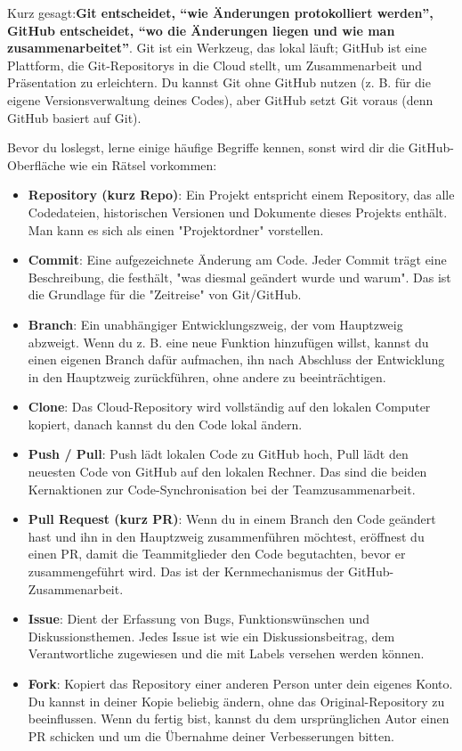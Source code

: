 Kurz gesagt:\textbf{Git entscheidet, “wie Änderungen protokolliert werden”, GitHub entscheidet, “wo die Änderungen liegen und wie man zusammenarbeitet”}. Git ist ein Werkzeug, das lokal läuft; GitHub ist eine Plattform, die Git-Repositorys in die Cloud stellt, um Zusammenarbeit und Präsentation zu erleichtern. Du kannst Git ohne GitHub nutzen (z. B. für die eigene Versionsverwaltung deines Codes), aber GitHub setzt Git voraus (denn GitHub basiert auf Git).



Bevor du loslegst, lerne einige häufige Begriffe kennen, sonst wird dir die GitHub-Oberfläche wie ein Rätsel vorkommen:

\begin{itemize}
  \item \textbf{Repository (kurz Repo)}: Ein Projekt entspricht einem Repository, das alle Codedateien, historischen Versionen und Dokumente dieses Projekts enthält. Man kann es sich als einen "Projektordner" vorstellen.
  \item \textbf{Commit}: Eine aufgezeichnete Änderung am Code. Jeder Commit trägt eine Beschreibung, die festhält, "was diesmal geändert wurde und warum". Das ist die Grundlage für die "Zeitreise" von Git/GitHub.
  \item \textbf{Branch}: Ein unabhängiger Entwicklungszweig, der vom Hauptzweig abzweigt. Wenn du z. B. eine neue Funktion hinzufügen willst, kannst du einen eigenen Branch dafür aufmachen, ihn nach Abschluss der Entwicklung in den Hauptzweig zurückführen, ohne andere zu beeinträchtigen.
  \item \textbf{Clone}: Das Cloud-Repository wird vollständig auf den lokalen Computer kopiert, danach kannst du den Code lokal ändern.
  \item \textbf{Push / Pull}: Push lädt lokalen Code zu GitHub hoch, Pull lädt den neuesten Code von GitHub auf den lokalen Rechner. Das sind die beiden Kernaktionen zur Code-Synchronisation bei der Teamzusammenarbeit.
  \item \textbf{Pull Request (kurz PR)}: Wenn du in einem Branch den Code geändert hast und ihn in den Hauptzweig zusammenführen möchtest, eröffnest du einen PR, damit die Teammitglieder den Code begutachten, bevor er zusammengeführt wird. Das ist der Kernmechanismus der GitHub-Zusammenarbeit.
  \item \textbf{Issue}: Dient der Erfassung von Bugs, Funktionswünschen und Diskussionsthemen. Jedes Issue ist wie ein Diskussionsbeitrag, dem Verantwortliche zugewiesen und die mit Labels versehen werden können.
  \item \textbf{Fork}: Kopiert das Repository einer anderen Person unter dein eigenes Konto. Du kannst in deiner Kopie beliebig ändern, ohne das Original-Repository zu beeinflussen. Wenn du fertig bist, kannst du dem ursprünglichen Autor einen PR schicken und um die Übernahme deiner Verbesserungen bitten.
\end{itemize}

